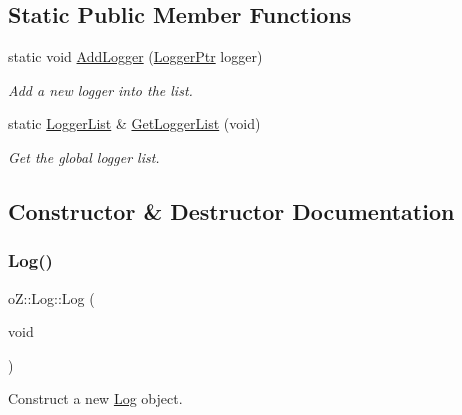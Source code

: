 \subsection*{Static Public Member Functions}
\begin{DoxyCompactItemize}
\item 
static void \mbox{\hyperlink{classo_z_1_1_log_a09f81a16467abe5e5f38d4caf9d9e738}{Add\+Logger}} (\mbox{\hyperlink{namespaceo_z_aaa2fbabbfafc6616a7e69651b62a3d4e}{Logger\+Ptr}} logger)
\begin{DoxyCompactList}\small\item\em Add a new logger into the list. \end{DoxyCompactList}\item 
static \mbox{\hyperlink{namespaceo_z_a2d18a70272709242e8e7ebffc3f1806c}{Logger\+List}} \& \mbox{\hyperlink{classo_z_1_1_log_aa1c737e66220f5f6f2f557c054b44e48}{Get\+Logger\+List}} (void)
\begin{DoxyCompactList}\small\item\em Get the global logger list. \end{DoxyCompactList}\end{DoxyCompactItemize}


\subsection{Constructor \& Destructor Documentation}
\mbox{\label{classo_z_1_1_log_afc1467edb15b611bbb42630e1acaee12}} 
\subsubsection{\texorpdfstring{Log()}{Log()}\hspace{0.1cm}{\footnotesize\ttfamily [1/2]}}
{\footnotesize\ttfamily o\+Z\+::\+Log\+::\+Log (\begin{DoxyParamCaption}\item[{void}]{ }\end{DoxyParamCaption})\hspace{0.3cm}{\ttfamily [default]}}



Construct a new \mbox{\hyperlink{classo_z_1_1_log}{Log}} object. 

\mbox{\label{classo_z_1_1_log_ad3902d7978a48f2c02174bd048acec17}} 
